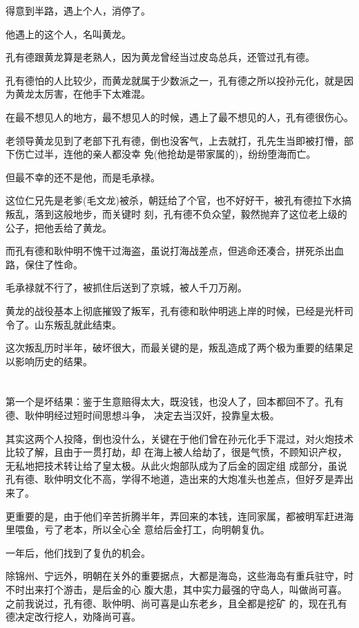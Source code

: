 \documentclass[11pt,a4paper,onecolumn]{article}
\begin{document}
得意到半路，遇上个人，消停了。

他遇上的这个人，名叫黄龙。

孔有德跟黄龙算是老熟人，因为黄龙曾经当过皮岛总兵，还管过孔有德。

孔有德怕的人比较少，而黄龙就属于少数派之一，孔有德之所以投孙元化，就是因为黄龙太厉害，在他手下太难混。

在最不想见人的地方，最不想见人的时候，遇上了最不想见的人，孔有德很伤心。

老领导黄龙见到了老部下孔有德，倒也没客气，上去就打，孔先生当即被打懵，部下伤亡过半，连他的亲人都没幸
免(他抢劫是带家属的)，纷纷堕海而亡。

但最不幸的还不是他，而是毛承禄。

这位仁兄先是老爹(毛文龙)被杀，朝廷给了个官，也不好好干，被孔有德拉下水搞叛乱，落到这般地步，而关键时
刻，孔有德不负众望，毅然抛弃了这位老上级的公子，把他丢给了黄龙。

而孔有德和耿仲明不愧干过海盗，虽说打海战差点，但逃命还凑合，拼死杀出血路，保住了性命。

毛承禄就不行了，被抓住后送到了京城，被人千刀万剐。

黄龙的战役基本上彻底摧毁了叛军，孔有德和耿仲明逃上岸的时候，已经是光杆司令了。山东叛乱就此结束。

这次叛乱历时半年，破坏很大，而最关键的是，叛乱造成了两个极为重要的结果\myrule 足以影响历史的结果。

\section[\thesection]{}

第一个是坏结果：鉴于生意赔得太大，既没钱，也没人了，回本都回不了。孔有德、耿仲明经过短时间思想斗争，
决定去当汉奸，投靠皇太极。

其实这两个人投降，倒也没什么，关键在于他们曾在孙元化手下混过，对火炮技术比较了解，且由于一贯打劫，却
在海上被人给劫了，很是气愤，不顾知识产权，无私地把技术转让给了皇太极。从此火炮部队成为了后金的固定组
成部分，虽说孔有德、耿仲明文化不高，学得不地道，造出来的大炮准头也差点，但好歹是弄出来了。

更重要的是，由于他们辛苦折腾半年，弄回来的本钱，连同家属，都被明军赶进海里喂鱼，亏了老本，所以全心全
意给后金打工，向明朝复仇。

一年后，他们找到了复仇的机会。

除锦州、宁远外，明朝在关外的重要据点，大都是海岛，这些海岛有重兵驻守，时不时出来打个游击，是后金的心
腹大患，其中实力最强的守岛人，叫做尚可喜。之前我说过，孔有德、耿仲明、尚可喜是山东老乡，且全都是挖矿
的，现在孔有德决定改行挖人，劝降尚可喜。
\end{document}

